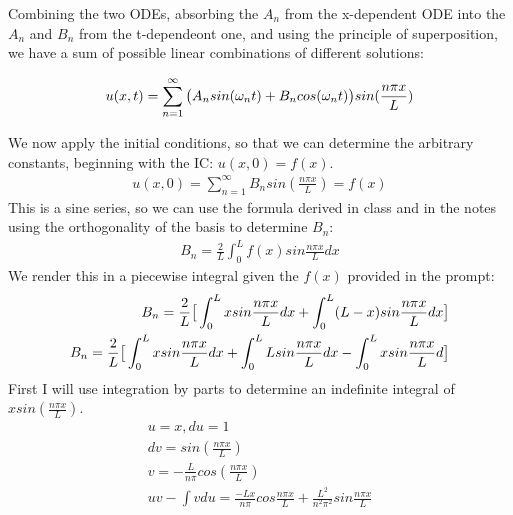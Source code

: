 \documentclass{article}
\begin{document}
Combining the two ODEs, absorbing the $A_n$ from the x-dependent ODE into the $A_n$ and $B_n$ from the t-dependeont one, and using the principle of superposition, we have a sum of possible linear combinations of different solutions:
\begin{tcolorbox}[minipage,colback=white,arc=0pt,outer arc=0pt]
\begin{equation}
\begin{aligned}
u(x,t) = \sum^{\infty}_{n=1}\big{(}A_nsin(\omega_n t) + B_ncos(\omega_n t)\big{)}sin(\frac{n\pi x}{L})
\end{aligned}
\end{equation}
\end{tcolorbox}
We now apply the initial conditions, so that we can determine the arbitrary constants, beginning with the IC: $u(x,0) = f(x)$.
\begin{equation}
\begin{aligned}
u(x,0) = \sum^{\infty}_{n=1}B_nsin(\frac{n\pi x}{L}) = f(x)
\end{aligned}
\end{equation}
This is a sine series, so we can use the formula derived in class and in the notes using the orthogonality of the basis to determine $B_n$:
\begin{equation}
\begin{aligned}
B_n = \frac{2}{L}\int_0^L f(x)sin\frac{n\pi x}{L}dx
\end{aligned}
\end{equation}
We render this in a piecewise integral given the $f(x)$ provided in the prompt:
\begin{equation}
\begin{aligned}
B_n = \frac{2}{L}\big{[}\int_0^L xsin\frac{n\pi x}{L}dx + \int_0^L (L-x)sin\frac{n\pi x}{L}dx\big{]}\\
B_n = \frac{2}{L}\big{[}\int_0^L xsin\frac{n\pi x}{L}dx + \int_0^L Lsin\frac{n\pi x}{L}dx -\int_0^L xsin\frac{n\pi x}{L}d \big{]}\\
\end{aligned}
\end{equation}
First I will use integration by parts to determine an indefinite integral of $xsin(\frac{n\pi x}{L})$.
\begin{equation}
\begin{aligned}
u = x, du = 1\\
dv = sin(\frac{n\pi x}{L})\\
v = -\frac{L}{n\pi}cos(\frac{n\pi x}{L})\\
uv - \int vdu = \frac{-Lx}{n\pi}cos\frac{n\pi x}{L} + \frac{L^2}{n^2\pi^2}sin\frac{n\pi x}{L}
\end{aligned}
\end{equation}
\end{document}
